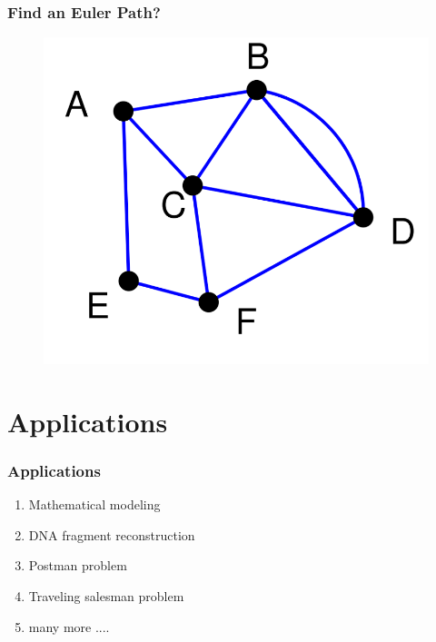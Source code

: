 \documentclass{beamer}
\begin{document}
\begin{frame}
\frametitle{Find an Euler Path?}
\begin{figure}[h]
\includegraphics[scale = 0.4]{path2.png}
\end{figure}
\end{frame}




\section{Applications}


\begin{frame}
\frametitle{Applications}
\begin{enumerate}
\item Mathematical modeling
\pause
\item DNA fragment reconstruction
\pause 
\item Postman problem
\pause
\item Traveling salesman problem

\item many more ....
\end{enumerate}
\end{frame}
\end{document}

